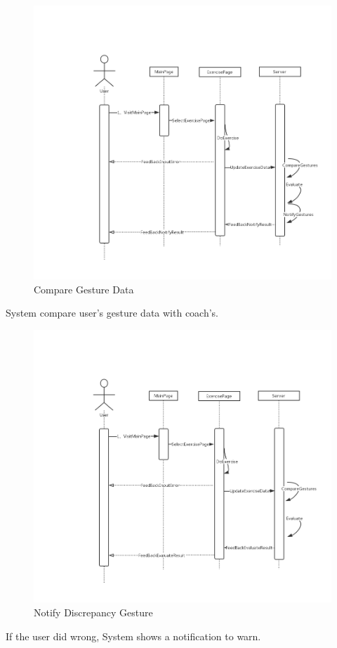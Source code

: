 \documentclass[16pt]{scrreprt}
\begin{document}
\begin{figure}[H]
    \includegraphics[width=\linewidth]{./FuncPhoto/15.png}   
    \caption{Compare Gesture Data}
\end{figure}
System compare user's gesture data with coach's.

\begin{figure}[H]
    \includegraphics[width=\linewidth]{./FuncPhoto/16.png}   
    \caption{Notify Discrepancy Gesture }
\end{figure}
If the user did wrong, System shows a notification to warn.
\end{document}
